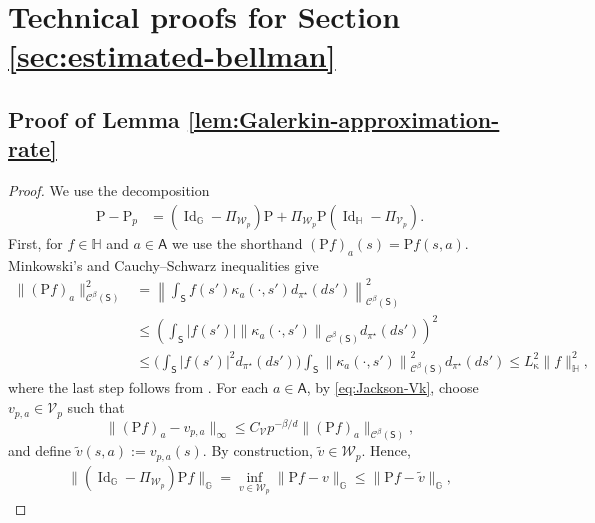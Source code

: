 \documentclass{article}
\theoremstyle{definition}
\theoremstyle{remark}
\theoremstyle{plain}
\newcommand{\MKQ}{\mathrm{P}}
\newcommand{\dsieve}{p}
\numberwithin{equation}{section}
\begin{document}
\section{Technical proofs for Section \ref{sec:estimated-bellman}}
\label{app:unknown-operator-proofs}

\subsection{Proof of Lemma \ref{lem:Galerkin-approximation-rate}}
\label{app:proof of galerkin rate}
\begin{proof}
We use the decomposition
\begin{align}
\label{eq:Galerkin-error-decomposition}
    \MKQ-\MKQ_{\dsieve}
    &=
    (\operatorname{Id}_{\mathbb G}
      -\Pi_{\mathcal W_{\dsieve}})\MKQ
   +
    \Pi_{\mathcal W_{\dsieve}}
    \MKQ
    (\operatorname{Id}_{\mathbb H}
      -\Pi_{\mathcal V_{\dsieve}}).
\end{align}
First, for \(f\in\mathbb H\) and \(a\in\mathsf{A}\) we use the shorthand $(\MKQ f)_a(s) = \MKQ f(s, a)$.  Minkowski's and Cauchy--Schwarz
inequalities give
\begin{align}
\label{eq:Pf_smoothness}
    \|(\MKQ f)_a\|_{\mathcal C^\beta_{}(\mathsf S)}^2
    &= 
    \left\|\int_{\mathsf{S}} f(s')\kappa_a(\cdot, s')d_{\pi^\star}(ds')\right\|_{\mathcal C^\beta(\mathsf S)}^2\\
    &\le
   \left( \int_{\mathsf{S}} |f(s')|\left\|\kappa_a(\cdot, s')\right\|_{\mathcal C^\beta(\mathsf S)} d_{\pi^\star}(ds')\right)^2
    \\
    &\le \Big(\int_{\mathsf{S}} |f(s')|^2d_{\pi^\star}(ds')\Big)
\int_{\mathsf{S}} \left\|\kappa_a(\cdot, s')\right\|_{\mathcal C^\beta(\mathsf S)}^2 d_{\pi^\star}(ds') \le 
    L_{\mathrm{\kappa}}^2\|f\|_{\mathbb H}^2,
\end{align}
where the last step follows from . For each \(a\in\mathsf A\), by \eqref{eq:Jackson-Vk}, choose
\(v_{\dsieve,a}\in\mathcal V_\dsieve\) such that
\[
    \|(\MKQ f)_a-v_{\dsieve,a}\|_\infty
    \leq
    C_{\mathcal V}\dsieve^{-\beta/d}
    \|(\MKQ f)_a\|_{\mathcal C^\beta(\mathsf S)},
\]
and define
\(\tilde v(s,a):=v_{\dsieve,a}(s)\).
By construction, \(\widetilde v\in\mathcal W_\dsieve\). Hence, 
\begin{align}
\label{eq:best_approx}
    \|(\operatorname{Id}_{\mathbb{G}} - \Pi_{\mathcal{W}_\dsieve})\MKQ f\|_{\mathbb{G}} = \inf_{v\in \mathcal{W}_\dsieve}\|\MKQ f - v\|_{\mathbb{G}} \le \|\MKQ f - \tilde v\|_{\mathbb{G}}, 

\end{align}
\end{proof}
\end{document}
